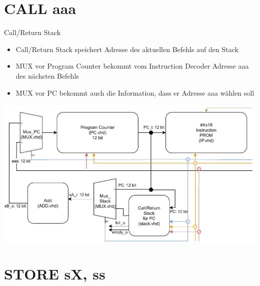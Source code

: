 \documentclass[10pt, t,
aspectratio=169,%
usenames,
dvipsnames,
]{beamer}
\begin{document}
	\section{CALL aaa}

	\begin{frame}{Call/Return Stack}
		\begin{multicols}{2}
		\begin{itemize}
			\item Call/Return Stack speichert Adresse des aktuellen Befehls auf den Stack
			\item MUX vor Program Counter bekommt vom Instruction Decoder Adresse aaa des nächsten Befehls
			\item MUX vor PC bekommt auch die Information, dass er Adresse aaa wählen soll
		\end{itemize}
		\includegraphics[width=\linewidth]{../Blockbeschreibungen/Stack-BlockdiagramSnipits.pdf}
		\end{multicols}
	\end{frame}

	\section{STORE sX, ss}
\end{document}
